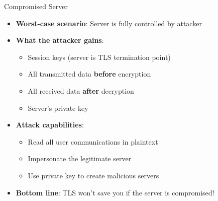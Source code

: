 \documentclass[aspectratio=169, lualatex, handout]{beamer}
\begin{document}
\begin{frame}{Compromised Server}
	\begin{itemize}[<+->]
		\item \textbf{Worst-case scenario}: Server is fully controlled by attacker
		\item \textbf{What the attacker gains}:
		      \begin{itemize}
			      \item Session keys (server is TLS termination point)
			      \item All transmitted data \textbf{before} encryption
			      \item All received data \textbf{after} decryption
			      \item Server's private key
		      \end{itemize}
		\item \textbf{Attack capabilities}:
		      \begin{itemize}
			      \item Read all user communications in plaintext
			      \item Impersonate the legitimate server
			      \item Use private key to create malicious servers
		      \end{itemize}
		\item \textbf{Bottom line}: TLS won't save you if the server is compromised!
	\end{itemize}
\end{frame}
\end{document}
